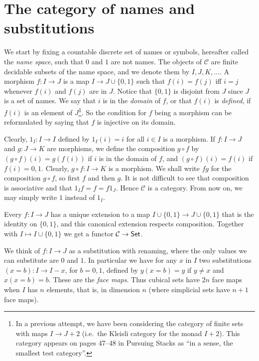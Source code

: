 \documentclass[10pt,a4paper]{article}
\newcommand{\CC}{{\mathcal C}}
\newcommand{\set}[1]{\{#1\}}
\begin{document}
\section{The category of names and substitutions}

 We start by fixing a countable discrete set of names or symbols, hereafter called the \emph{name space},
such that $0$ and $1$ are not names.
The objects of $\CC$ are finite decidable subsets of the name space,
and we denote them by $I,J,K,\dots$.
A morphism $f:I\to J$ is a map $I \to J\cup \set{0,1}$ such that $f(i) = f(j)$ if{f} $i=j$ whenever
$f(i)$ and $f(j)$ are in $J$. Notice that $\set{0,1}$ is disjoint from $J$ since $J$ is a set of
names. We say that $i$ is in the \emph{domain} of $f$, or that $f(i)$ is \emph{defined},
if $f(i)$ is an element of $J$\footnote%
{In a previous attempt, we have been considering the category of finite sets
with maps $I \to J+2$ (i.e.\ the Kleisli category for the monad $I+2$).
This category appears on pages 47--48 in Pursuing Stacks
\cite{Grothendieck} as ``in a sense, the smallest test category''.}.
So the condition for $f$ being a morphism can be reformulated by saying that $f$ is injective on its domain.

Clearly, $1_I : I\to I$ defined by $1_I(i) = i$ for all $i\in I$ is a morphism.
If $f:I\to J$ and $g:J\to K$ are morphisms, we define the composition $g\circ f$ by
$(g\circ f)(i) = g(f(i))$ if $i$ is in the domain of $f$, and $(g\circ f)(i) = f(i)$ if $f(i)= 0,1$.
Clearly, $g\circ f: I\to K$ is a morphism.
We shall write $fg$ for the composition $g\circ f$, so first $f$ and then $g$.
It is not difficult to see that composition is associative and that $1_I f = f = f 1_J$.
Hence $\CC$ is a category. From now on, we may simply write $1$ instead of $1_I$.

Every $f:I\to J$ has a unique extension to a map $I \cup \set{0,1} \to J\cup \set{0,1}$
that is the identity on $\set{0,1}$, and this canonical extension respects composition.
Together with $I\mapsto I \cup \set{0,1}$ we get a functor $\CC\to{\sf Set}$.

 We think of $f:I\to J$ as a substitution with renaming,
 where the only values we can substitute are $0$ and $1$.
In particular we have for any $x$ in $I$ two substitutions $(x=b):I\to I-x$, for $b=0,1$,
defined by $y(x=b) = y$ if $y\neq x$ and $x(x=b) = b$. These are the \emph{face maps}.
Thus cubical sets have $2n$ face maps when $I$ has $n$ elements, that is, in dimension $n$
(where simplicial sets have $n+1$ face maps).
\end{document}
